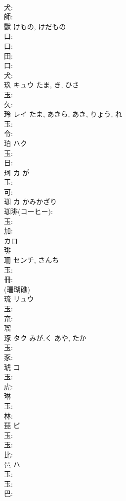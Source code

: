 \documentclass[8pt]{extreport}
\begin{document}
\begin{CJK}{UTF8}{min}
\\	犬: 
\\	師: 
\\	獸		けもの, けだもの				
\\	口: 
\\	口: 
\\	田: 
\\	口: 
\\	犬: 
\\	玖	キュウ		たま, き, ひさ	
\\	玉: 
\\	久: 
\\	玲	レイ		たま, あきら, あき, りょう, れ	
\\	玉: 
\\	令: 
\\	珀	ハク			
\\	玉: 
\\	日: 
\\	珂	カ		が	
\\	玉: 
\\	可: 
\\	珈	カ	かみかざり		
\\	珈琲(コーヒー): 
\\	玉: 
\\	加: 
\\	カロ
\\	琲 
\\	珊		センチ, さんち				
\\	玉: 
\\	冊: 
\\	(珊瑚礁) 
\\	琉	リュウ			
\\	玉: 
\\	㐬: 
\\	瑠 
\\	琢	タク	みが.く	あや, たか	
\\	玉: 
\\	豕: 
\\	琥	コ			
\\	玉: 
\\	虎: 
\\	琳						
\\	玉: 
\\	林: 
\\	琵	ビ			
\\	玉: 
\\	玉: 
\\	比: 
\\	琶	ハ			
\\	玉: 
\\	玉: 
\\	巴: 

\end{CJK}
\end{document}
